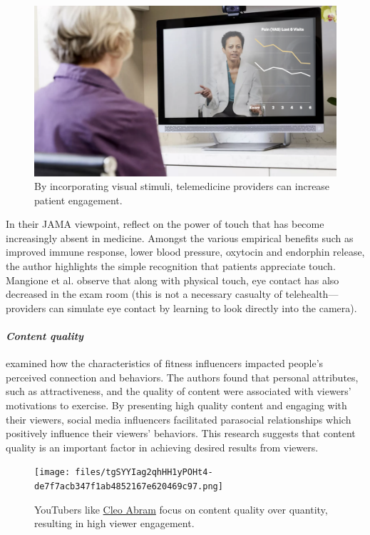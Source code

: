 \documentclass[utf8]{FrontiersinHarvard} %
\begin{document}
\begin{figure}[!htbp]
\centering
\includegraphics[width=0.7\linewidth]{files/tgSYYIag2qhHH1yPOHt4-e4b6540943de5e6953f3e889c3ee3358.png}
\caption[]{By incorporating visual stimuli, telemedicine providers can increase patient engagement.}
\label{SK3YTBY2uG}
\end{figure}

In their JAMA viewpoint, \citet{Mangione2024Out} reflect on the power of touch that has become increasingly absent in medicine. Amongst the various empirical benefits such as improved immune response, lower blood pressure, oxytocin and endorphin release, the author highlights the simple recognition that patients appreciate touch. Mangione et al. observe that along with physical touch, eye contact has also decreased in the exam room (this is not a necessary casualty of telehealth---providers can simulate eye contact by learning to look directly into the camera).

\paragraph{\textit{Content quality}}

\citet{liImpactFitnessInfluencers2023} examined how the characteristics of fitness influencers impacted people's perceived connection and behaviors. The authors found that personal attributes, such as attractiveness, and the quality of content were associated with viewers' motivations to exercise. By presenting high quality content and engaging with their viewers, social media influencers facilitated parasocial relationships which positively influence their viewers' behaviors. This research suggests that content quality is an important factor in achieving desired results from viewers.

\begin{figure}[!htbp]
\centering
\texttt{[image: files/tgSYYIag2qhHH1yPOHt4-de7f7acb347f1ab4852167e620469c97.png]}
\caption[]{YouTubers like \href{https://youtube.com/@cleoabram}{Cleo Abram} focus on content quality over quantity, resulting in high viewer engagement.}
\label{ClmRhKctf5}
\end{figure}
\end{document}

